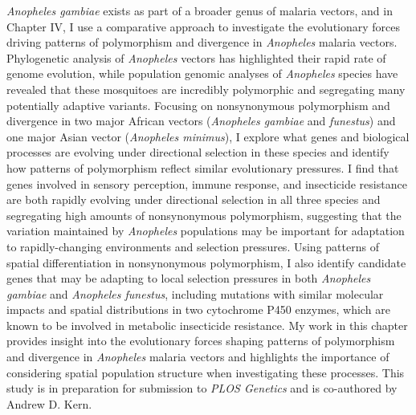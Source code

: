 \textit{Anopheles gambiae} exists as part of a broader genus of malaria vectors, and in Chapter IV, I use 
a comparative approach to investigate the
evolutionary forces driving patterns of polymorphism and divergence in \textit{Anopheles} malaria vectors. 
Phylogenetic analysis of \textit{Anopheles} vectors has highlighted their rapid rate
of genome evolution, while population genomic analyses of \textit{Anopheles} species have revealed that 
these mosquitoes are incredibly polymorphic and segregating many potentially adaptive variants.
Focusing on nonsynonymous polymorphism and divergence in two major African vectors (\textit{Anopheles gambiae} and \textit{funestus}) 
and one major Asian vector (\textit{Anopheles minimus}), 
I explore what genes and biological processes are evolving under directional selection in these species
and identify how patterns of polymorphism reflect similar evolutionary pressures.
I find that genes involved in sensory perception, immune response, and insecticide resistance are
both rapidly evolving under directional selection in all three species and segregating high amounts of nonsynonymous polymorphism,
suggesting that the variation maintained by \textit{Anopheles} populations may be important for adaptation to rapidly-changing
environments and selection pressures.
Using patterns of spatial differentiation in nonsynonymous polymorphism, I also identify candidate genes that may be adapting
to local selection pressures in both \textit{Anopheles gambiae} and \textit{Anopheles funestus}, including mutations with 
similar molecular impacts and spatial distributions in two 
cytochrome P450 enzymes, which are known to be involved in metabolic insecticide resistance.
My work in this chapter provides insight into the evolutionary forces shaping patterns of polymorphism and divergence in 
\textit{Anopheles} malaria vectors and highlights the importance of considering spatial population structure when investigating these processes.
This study is in preparation for submission to \textit{PLOS Genetics} and is co-authored by Andrew D. Kern.

